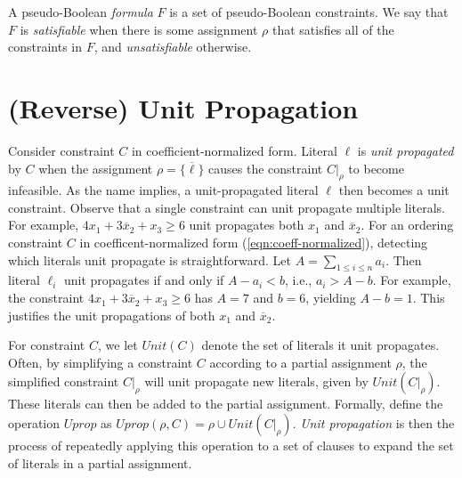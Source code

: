 \documentclass{easychair}
\renewcommand{\obar}[1]{\overline{#1}}
\newcommand{\lit}{\ell}
\newcommand{\assign}{\rho}
\newcommand{\simplify}[2]{#1|_{#2}}
\newcommand{\unit}{\mathit{Unit}}
\newcommand{\uprop}{\mathit{Uprop}}
\newcommand{\imply}{\Rightarrow}
\begin{document}


A pseudo-Boolean {\em formula} $F$ is a set of pseudo-Boolean
constraints.  We say that $F$ is {\em satisfiable} when there is some
assignment $\assign$ that satisfies all of the constraints in $F$, and
{\em unsatisfiable} otherwise.  



\section{(Reverse) Unit Propagation}

Consider constraint $C$ in coefficient-normalized form.  Literal
$\lit$ is {\em unit propagated} by $C$ when the assignment $\assign =
\{ \obar{\lit} \}$ causes the constraint $\simplify{C}{\assign}$ to become
infeasible.  As the name implies, a unit-propagated literal $\lit$ then becomes a unit constraint.
Observe that a single constraint can unit propagate
multiple literals.  For example, $4 x_1 + 3 \obar{x}_2 + x_3 \geq 6$
unit propagates both $x_1$ and $\obar{x}_2$.
For an ordering constraint $C$ in coefficent-normalized form
(\ref{eqn:coeff-normalized}), detecting which literals unit propagate
is straightforward.  Let $A = \sum_{1 \leq i \leq n} a_{i}$.  Then
literal $\lit_{i}$ unit propagates if and only if $A - a_{i} < b$,
i.e., $a_{i} > A - b$.  For example, the constraint $4 x_1 + 3
\obar{x}_2 + x_3 \geq 6$ has $A = 7$ and $b=6$, yielding $A-b=1$.
This justifies the unit propagations of both $x_1$ and $\obar{x}_2$.

For constraint $C$, we let $\unit(C)$ denote the set of literals it
unit propagates.  Often, by simplifying a constraint $C$ according to
a partial assignment $\assign$, the simplified constraint $\simplify{C}{\assign}$
will unit propagate new literals, given by $\unit(\simplify{C}{\assign})$.  These
literals can then be added to the partial assignment.  Formally,
define the operation $\uprop$ as  $\uprop(\assign, C) = \assign \cup \unit(\simplify{C}{\assign})$.
{\em Unit propagation} is then the process of
repeatedly applying this operation to a set of clauses to expand the
set of literals in a partial assignment.
\end{document}

